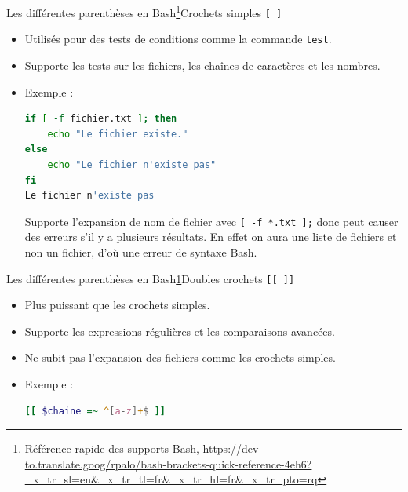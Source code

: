 \documentclass{beamer}
\begin{document}
    \begin{frame}[fragile]{Les différentes parenthèses en Bash\footnote{\label{penthesisbash}Référence rapide des supports Bash, \url{https://dev-to.translate.goog/rpalo/bash-brackets-quick-reference-4eh6?_x_tr_sl=en&_x_tr_tl=fr&_x_tr_hl=fr&_x_tr_pto=rq}}}{Crochets simples \texttt{[ ]}}
        \begin{small}
            \begin{itemize}
                \item Utilisés pour des tests de conditions comme la commande \lstinline{test}.
                \item Supporte les tests sur les fichiers, les chaînes de caractères et les nombres.
                \item Exemple :
                \begin{lstlisting}[language=bash]
if [ -f fichier.txt ]; then
    echo "Le fichier existe."
else
    echo "Le fichier n'existe pas"
fi
Le fichier n'existe pas
                \end{lstlisting}
                \begin{dangercolorbox}
                    Supporte l'expansion de nom de fichier\footnotemark{} avec \lstinline{[ -f *.txt ];} donc peut causer des erreurs s'il y a plusieurs résultats.
                    En effet on aura une liste de fichiers et non un fichier, d'où une erreur de syntaxe Bash.
                \end{dangercolorbox}
            \end{itemize}
        \end{small}
    \end{frame}

    \begin{frame}[fragile]{Les différentes parenthèses en Bash\cref{penthesisbash}}{Doubles crochets \texttt{[[ ]]}}
        \begin{itemize}
            \item Plus puissant que les crochets simples.
            \item Supporte les expressions régulières et les comparaisons avancées.
            \item Ne subit pas l'expansion des fichiers comme les crochets simples.
            \item Exemple :
            \begin{lstlisting}[language=bash]
[[ $chaine =~ ^[a-z]+$ ]]
            \end{lstlisting}
        \end{itemize}
    \end{frame}
\end{document}
